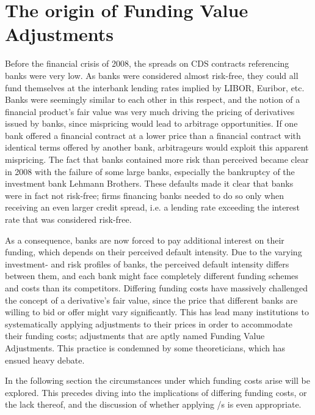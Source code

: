 \documentclass[main.tex]{subfiles}
\begin{document}
    \section{The origin of Funding Value Adjustments}
        Before the financial crisis of 2008, the spreads on CDS contracts referencing banks were very low. 
        As banks were considered almost risk-free, 
        they could all fund themselves at the interbank lending rates implied by LIBOR, Euribor, etc.
        Banks were seemingly similar to each other in this respect, 
        and the notion of a financial product's fair value was very much driving the pricing of derivatives issued by banks,
        since mispricing would lead to arbitrage opportunities.
        If one bank offered a financial contract at a lower price than a financial contract with identical terms
        offered by another bank, arbitrageurs would exploit this apparent mispricing. 
        The fact that banks contained more risk than perceived became clear in 2008
        with the failure of some large banks, 
        especially the bankruptcy of the investment bank Lehmann Brothers.
        These defaults made it clear that banks were in fact not risk-free; 
        firms financing banks needed to do so only when receiving an even larger credit spread,
        i.e. a lending rate exceeding the interest rate that was considered risk-free. 
        
        As a consequence, banks are now forced to pay additional interest on their funding, 
        which depends on their perceived default intensity.
        Due to the varying investment- and risk profiles of banks, 
        the perceived default intensity differs between them, 
        and each bank might face completely different funding schemes and costs than its competitors.
        Differing funding costs have massively challenged the concept of a derivative's fair value,
        since the price that different banks are willing to bid or offer might vary significantly. 
        This has lead many institutions to systematically applying adjustments to their prices
        in order to accommodate their funding costs; 
        adjustments that are aptly named Funding Value Adjustments. 
        This practice is condemned by some theoreticians, 
        which has ensued heavy debate.
        
        In the following section the circumstances under which funding costs arise will be explored.
        This precedes diving into the implications of differing funding costs, or the lack thereof,
        and the discussion of whether applying \FVA/s is even appropriate.
\end{document}
